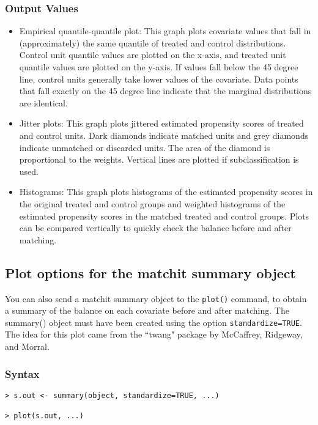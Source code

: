 \subsubsection{Output Values}

\begin{itemize}
\item Empirical quantile-quantile plot: This graph plots covariate
  values that fall in (approximately) the same quantile of treated and
  control distributions.  Control unit quantile values are plotted on
  the x-axis, and treated unit quantile values are plotted on the
  y-axis.  If values fall below the 45 degree line, control units
  generally take lower values of the covariate.  Data points that fall
  exactly on the 45 degree line indicate that the marginal
  distributions are identical.
  
\item Jitter plots: This graph plots jittered estimated propensity
  scores of treated and control units.  Dark diamonds indicate matched
  units and grey diamonds indicate unmatched or discarded units.  The
  area of the diamond is proportional to the weights. Vertical lines
  are plotted if subclassification is used.

\item Histograms: This graph plots histograms of the estimated propensity 
scores in the original treated and control groups and weighted histograms of the estimated
propensity scores in the matched treated and control groups.  Plots can be compared vertically to
quickly check the balance before and after matching.  

\end{itemize}

\subsection{Plot options for the matchit summary object}
You can also send a matchit summary object to the \texttt{plot()} command, to obtain
a summary of the balance on each covariate before and after matching.  The summary() object
must have been created using the option \texttt{standardize=TRUE}.  The idea for this plot
came from the ``twang" package by McCaffrey, Ridgeway, and Morral.  

\subsubsection{Syntax}

\begin{verbatim}
> s.out <- summary(object, standardize=TRUE, ...)

> plot(s.out, ...)
\end{verbatim}

